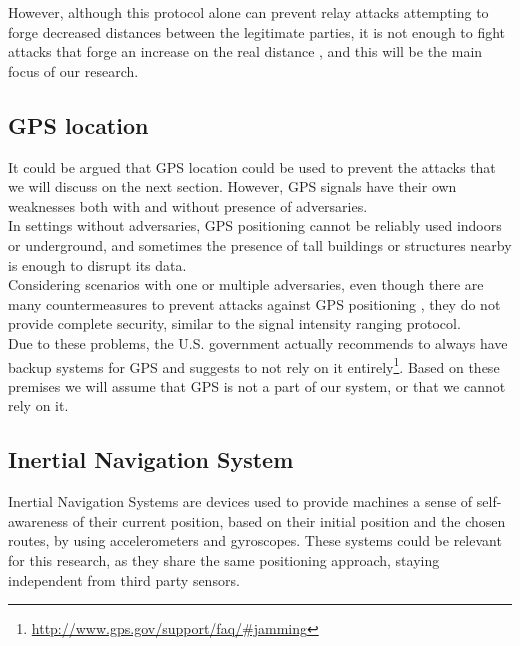 \documentclass{article}
\begin{document}
However, although this protocol alone can prevent relay attacks attempting to forge decreased distances between the legitimate parties, it is not enough to fight attacks that forge an increase on the real distance \cite{capkun2006secure}, and this will be the main focus of our research.\\



\subsection{GPS location}

It could be argued that GPS location could be used to prevent the attacks that we will discuss on the next section. However, GPS signals have their own weaknesses both with and without presence of adversaries.\\

In settings without adversaries, GPS positioning cannot be reliably used indoors or underground, and sometimes the presence of tall buildings or structures nearby is enough to disrupt its data.\\

Considering scenarios with one or multiple adversaries, even though there are many countermeasures to prevent attacks against GPS positioning \cite{jafarnia2012gps, warner2003gps, wen2005countermeasures}, they do not provide complete security, similar to the signal intensity ranging protocol.\\

Due to these problems, the U.S. government actually recommends to always have backup systems for GPS and suggests to not rely on it entirely\footnote{\url{http://www.gps.gov/support/faq/#jamming}}. Based on these premises we will assume that GPS is not a part of our system, or that we cannot rely on it.\\

\subsection{Inertial Navigation System}

Inertial Navigation Systems are devices used to provide machines a sense of self-awareness of their current position, based on their initial position and the chosen routes, by using accelerometers and gyroscopes. These systems could be relevant for this research, as they share the same positioning approach, staying independent from third party sensors.\\
\end{document}
